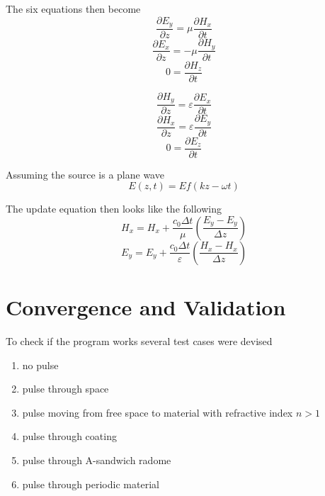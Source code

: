 \documentclass{article}
\begin{document}
The six equations then become
\begin{equation}
\frac{\partial E_y}{\partial z} = \mu \frac{\partial H_x}{\partial t}
\end{equation}
\begin{equation}
\frac{\partial E_x}{\partial z} = -\mu \frac{\partial H_y}{\partial t}
\end{equation}
\begin{equation}
0 = \frac{\partial H_z}{\partial t}
\end{equation}

\begin{equation}
\frac{\partial H_y}{\partial z} = \varepsilon \frac{\partial E_x}{\partial t}
\end{equation}
\begin{equation}
\frac{\partial H_x}{\partial z} = \varepsilon \frac{\partial E_y}{\partial t}
\end{equation}
\begin{equation}
0 = \frac{\partial E_z}{\partial t}
\end{equation}

Assuming the source is a plane wave
\begin{equation}
E(z,t) = E f(k z - \omega t)
\end{equation}

The update equation then looks like the following
\begin{equation}
H_x = H_x + \frac{c_0 \Delta t}{\mu} \left( \frac{E_y - E_y}{\Delta z} \right)
\end{equation}
\begin{equation}
E_y = E_y + \frac{c_0 \Delta t}{\varepsilon} \left( \frac{H_x-H_x}{\Delta z} \right)
\end{equation}
\section{Convergence and Validation}
To check if the program works several test cases were devised
\begin{enumerate}
\item no pulse
\item pulse through space
\item pulse moving from free space to material with refractive index $n > 1$
\item pulse through coating
\item pulse through A-sandwich radome
\item pulse through periodic material
\end{enumerate}
\end{document}
